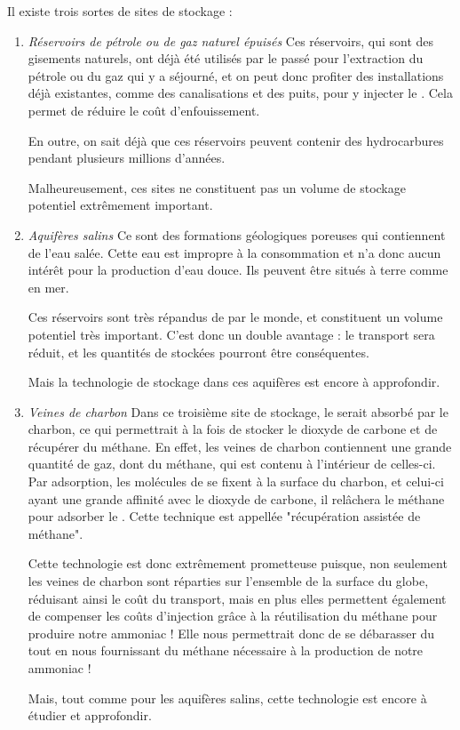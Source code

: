 \documentclass[a4, oneside, headings=normal]{scrartcl}
\begin{document}
Il existe trois sortes de sites de stockage :
\begin{enumerate}
\item \emph{Réservoirs de pétrole ou de gaz naturel épuisés} Ces réservoirs, qui sont des gisements naturels, ont déjà été utilisés par le passé pour l'extraction du pétrole ou du gaz qui y a séjourné, et on peut donc profiter des installations déjà existantes, comme des canalisations et des puits, pour y injecter le . Cela permet de réduire le coût d'enfouissement.

En outre, on sait déjà que ces réservoirs peuvent contenir des hydrocarbures pendant plusieurs millions d'années.

Malheureusement, ces sites ne constituent pas un volume de stockage potentiel extrêmement important.

\item \emph{Aquifères salins\cite{aquisalin}} Ce sont des formations géologiques poreuses qui contiennent de l'eau salée. Cette eau est impropre à la consommation et n'a donc aucun intérêt pour la production d'eau douce. Ils peuvent être situés à terre comme en mer.

Ces réservoirs sont très répandus de par le monde, et constituent un volume potentiel très important. C'est donc un double avantage : le transport sera réduit, et les quantités de  stockées pourront être conséquentes.

Mais la technologie de stockage dans ces aquifères est encore à approfondir.

\item \emph{Veines de charbon} Dans ce troisième site de stockage, le  serait absorbé par le charbon, ce qui permettrait à la fois de stocker le dioxyde de carbone et de récupérer du méthane. En effet, les veines de charbon contiennent une grande quantité de gaz, dont du méthane, qui est contenu à l'intérieur de celles-ci. Par adsorption, les molécules de  se fixent à la surface du charbon, et celui-ci ayant une grande affinité avec le dioxyde de carbone, il relâchera le méthane pour adsorber le . Cette technique est appellée "récupération assistée de méthane".

Cette technologie est donc extrêmement prometteuse puisque, non seulement les veines de charbon sont réparties sur l'ensemble de la surface du globe, réduisant ainsi le coût du transport, mais en plus elles permettent également de compenser les coûts d'injection grâce à la réutilisation du méthane pour produire notre ammoniac ! Elle nous permettrait donc de se débarasser du  tout en nous fournissant du méthane nécessaire à la production de notre ammoniac !

Mais, tout comme pour les aquifères salins, cette technologie est encore à étudier et approfondir. 
 
\end{enumerate}
\end{document}

